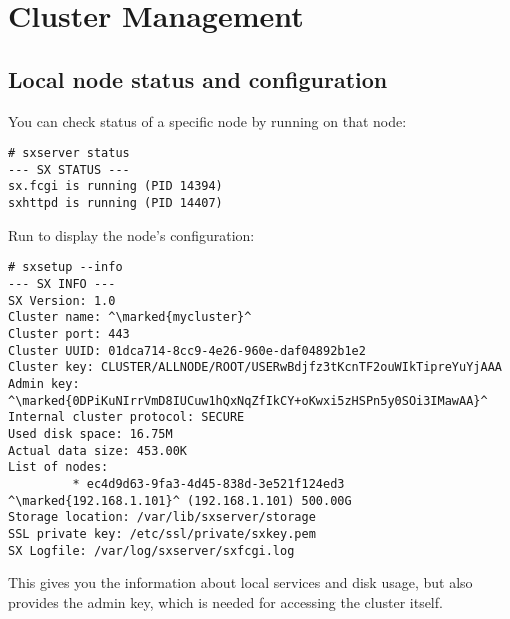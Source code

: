 \chapter{Cluster Management}

\section{Local node status and configuration}
You can check status of a specific node by running  on
that node:
\begin{lstlisting}
# sxserver status
--- SX STATUS ---
sx.fcgi is running (PID 14394)
sxhttpd is running (PID 14407)
\end{lstlisting}
Run  to display the node's configuration:
\begin{lstlisting}
# sxsetup --info
--- SX INFO ---
SX Version: 1.0
Cluster name: ^\marked{mycluster}^
Cluster port: 443
Cluster UUID: 01dca714-8cc9-4e26-960e-daf04892b1e2
Cluster key: CLUSTER/ALLNODE/ROOT/USERwBdjfz3tKcnTF2ouWIkTipreYuYjAAA
Admin key: ^\marked{0DPiKuNIrrVmD8IUCuw1hQxNqZfIkCY+oKwxi5zHSPn5y0SOi3IMawAA}^
Internal cluster protocol: SECURE
Used disk space: 16.75M
Actual data size: 453.00K
List of nodes:
         * ec4d9d63-9fa3-4d45-838d-3e521f124ed3 ^\marked{192.168.1.101}^ (192.168.1.101) 500.00G
Storage location: /var/lib/sxserver/storage
SSL private key: /etc/ssl/private/sxkey.pem
SX Logfile: /var/log/sxserver/sxfcgi.log
\end{lstlisting}
This gives you the information about local services and disk usage, but
also provides the admin key, which is needed for accessing the cluster
itself.

